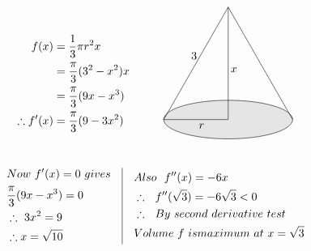 \documentclass[17pt]{extarticle}
\begin{document}
\begin{fleqn}
\begin{equation} \nonumber
\begin{alignedat}{4}
f(x) &= \frac{1}{3}\pi r^2x\\
&= \frac{\pi}{3}(3^2-x^2)x\\
&= \frac{\pi}{3}(9x - x^3)\\
\therefore f'(x) &=  \frac{\pi}{3}(9 - 3x^2)\\
\end{alignedat}
\quad\quad\quad
\begin{alignedat}{4}
\begin{tikzpicture}
\filldraw[fill=gray!20](0,0) ellipse (2cm and 0.6cm);
\draw (0,0) -- node[below] {\ \ \ $x$}(0,3.5);
\draw (0,0)  -- node[below] {\ \ \ $r$} (-2,0);
\draw  (-2,0) --node[above] {3\ \ }(0,3.5);
\draw  (2,0) -- (0,3.5);
\end{tikzpicture}\\\\
\end{alignedat}
\end{equation}
\begin{equation} \nonumber
\begin{alignedat}{4}
& Now\ f'(x) = 0\ gives\\
& \frac{\pi}{3}(9x - x^3)=0\\
& \therefore \ 3x^2=9\\
& \therefore x = \sqrt{10}
\end{alignedat}
\quad
\vrule
\quad
\begin{alignedat}{4}
& Also\ \ f''(x) =-6x\\
& \therefore\ \ f''(\sqrt{3})=-6\sqrt{3}<0\\
& \therefore \ \ By\ second\ derivative\ test\\
& Volume \ f\ is maximum\ at\ x=\sqrt{3}
\end{alignedat}
\end{equation}


\end{fleqn}
\end{document}
